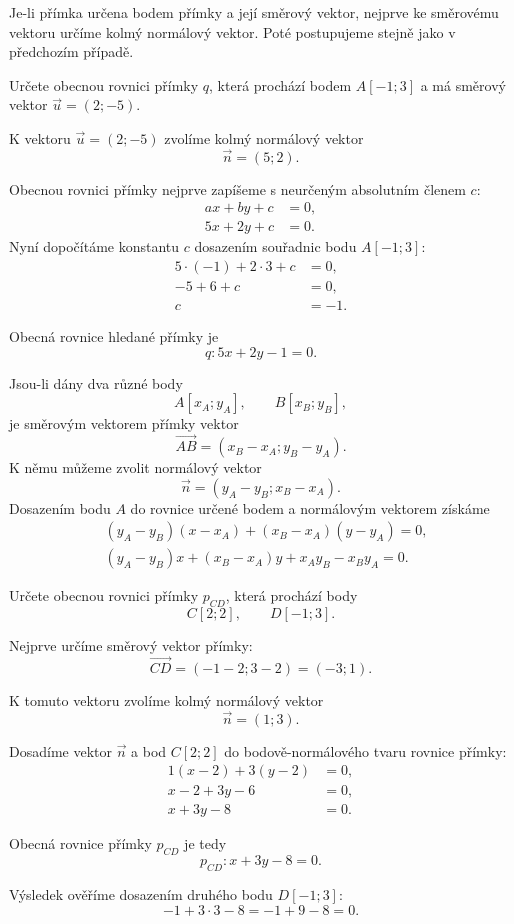 Je-li přímka určena bodem přímky a její směrový vektor, nejprve ke směrovému
vektoru určíme kolmý normálový vektor. Poté postupujeme stejně jako
v předchozím případě.

\begin{example}\label{exa:General_line_from_point_direction}
    Určete obecnou rovnici přímky $q$, která prochází bodem $A[-1;3]$ a má směrový vektor $\vec{u}=(2;-5)$.
    
    K vektoru $\vec{u}=(2;-5)$ zvolíme kolmý normálový vektor
    \[
        \vec{n}=(5;2).
    \]

    Obecnou rovnici přímky nejprve zapíšeme s neurčeným absolutním
    členem $c$:
    \begin{align*}
        ax+by+c &= 0,\\
        5x+2y+c &= 0.
    \end{align*}
    Nyní dopočítáme konstantu $c$ dosazením souřadnic bodu $A[-1;3]$:
    \begin{align*}
        5\cdot(-1) + 2\cdot3 + c &= 0,\\
        -5 + 6 + c &= 0,\\
        c &= -1.
    \end{align*}

    Obecná rovnice hledané přímky je
    \[
        q: 5x+2y-1=0.
    \]
\end{example}

Jsou-li dány dva různé body
\[
    A[x_A;y_A],
    \qquad
    B[x_B;y_B],
\]
je směrovým vektorem přímky vektor
\[
    \overrightarrow{AB}=(x_B-x_A;y_B-y_A).
\]
K němu můžeme zvolit normálový vektor
\[
    \vec{n}=(y_A-y_B;x_B-x_A).
\]
Dosazením bodu $A$ do rovnice určené bodem a normálovým vektorem
získáme
\begin{align*}
    &(y_A-y_B)(x-x_A)+(x_B-x_A)(y-y_A)=0,\\
    &(y_A-y_B)x+(x_B-x_A)y+x_Ay_B-x_By_A=0.
\end{align*}

\begin{example}\label{exa:General_line_from_two_points}
    Určete obecnou rovnici přímky $p_{CD}$, která prochází body
    \[
        C[2;2],
        \qquad
        D[-1;3].
    \]

    Nejprve určíme směrový vektor přímky:
    \[
        \overrightarrow{CD}
        =
        (-1-2;3-2)
        =
        (-3;1).
    \]

    K tomuto vektoru zvolíme kolmý normálový vektor
    \[
        \vec{n}=(1;3).
    \]

    Dosadíme vektor $\vec{n}$ a bod $C[2;2]$ do bodově-normálového tvaru rovnice přímky:
    \begin{align*}
        1(x-2)+3(y-2)&=0,\\
        x-2+3y-6&=0,\\
        x+3y-8&=0.
    \end{align*}
    
    Obecná rovnice přímky $p_{CD}$ je tedy
    \[
        p_{CD}: x+3y-8=0.
    \]

    Výsledek ověříme dosazením druhého bodu $D[-1;3]$:
    \[
        -1+3\cdot3-8=-1+9-8=0.
    \]
\end{example}

